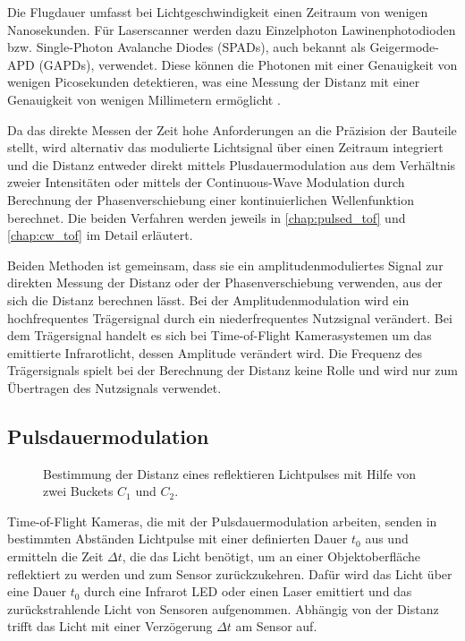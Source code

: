 \documentclass[thesis.tex]{subfiles}
\begin{document}
Die Flugdauer umfasst bei Lichtgeschwindigkeit einen Zeitraum von wenigen Nanosekunden. Für Laserscanner werden dazu Einzelphoton Lawinenphotodioden bzw. Single-Photon Avalanche Diodes (SPADs), auch bekannt als Geigermode-APD (GAPDs), verwendet. Diese können die Photonen mit einer Genauigkeit von wenigen Picosekunden detektieren, was eine Messung der Distanz mit einer Genauigkeit von wenigen Millimetern ermöglicht \cite{bib:Giancola2018}.

Da das direkte Messen der Zeit hohe Anforderungen an die Präzision der Bauteile stellt, wird alternativ das modulierte Lichtsignal über einen Zeitraum integriert und die Distanz entweder direkt mittels Plusdauermodulation aus dem Verhältnis zweier Intensitäten oder mittels der Continuous-Wave Modulation durch Berechnung der Phasenverschiebung einer kontinuierlichen Wellenfunktion berechnet. Die beiden Verfahren werden jeweils in \autoref{chap:pulsed_tof} und \autoref{chap:cw_tof} im Detail erläutert.

Beiden Methoden ist gemeinsam, dass sie ein amplitudenmoduliertes Signal zur direkten Messung der Distanz oder der Phasenverschiebung verwenden, aus der sich die Distanz berechnen lässt. Bei der Amplitudenmodulation wird ein hochfrequentes Trägersignal durch ein niederfrequentes Nutzsignal verändert. Bei dem Trägersignal handelt es sich bei Time-of-Flight Kamerasystemen um das emittierte Infrarotlicht, dessen Amplitude verändert wird. Die Frequenz des Trägersignals spielt bei der Berechnung der Distanz keine Rolle und wird nur zum Übertragen des Nutzsignals verwendet.

\subsection{Pulsdauermodulation}\label{chap:pulsed_tof}

\begin{figure}[ht]
    \centering
    \caption{Bestimmung der Distanz eines reflektieren Lichtpulses mit Hilfe von zwei Buckets $C_1$ und $C_2$.}
    \label{fig:pulsed_tof}
\end{figure}

Time-of-Flight Kameras, die mit der Pulsdauermodulation arbeiten, senden in bestimmten Abständen Lichtpulse mit einer definierten Dauer $t_0$ aus und ermitteln die Zeit $\Delta t$, die das Licht benötigt, um an einer Objektoberfläche reflektiert zu werden und zum Sensor zurückzukehren. Dafür wird das Licht über eine Dauer $t_0$ durch eine Infrarot LED oder einen Laser emittiert und das zurückstrahlende Licht von Sensoren aufgenommen. Abhängig von der Distanz trifft das Licht mit einer Verzögerung $\Delta t$ am Sensor auf. 
\end{document}
